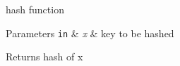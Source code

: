 hash function 


\begin{DoxyParams}[1]{Parameters}
\mbox{\tt in}  & {\em x} & key to be hashed \\
\hline
\end{DoxyParams}
\begin{DoxyReturn}{Returns}
hash of {\ttfamily x} 
\end{DoxyReturn}
